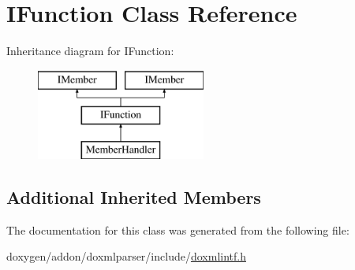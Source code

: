 \hypertarget{class_i_function}{}\section{I\+Function Class Reference}
\label{class_i_function}
Inheritance diagram for I\+Function\+:\begin{figure}[H]
\begin{center}
\leavevmode
\includegraphics[height=3.000000cm]{class_i_function}
\end{center}
\end{figure}
\subsection*{Additional Inherited Members}


The documentation for this class was generated from the following file\+:\begin{DoxyCompactItemize}
\item 
doxygen/addon/doxmlparser/include/\mbox{\hyperlink{include_2doxmlintf_8h}{doxmlintf.\+h}}\end{DoxyCompactItemize}
